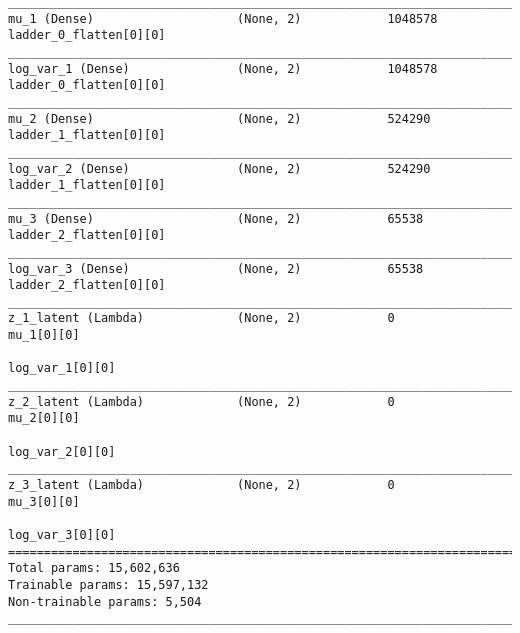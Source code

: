 \begin{lstlisting}[caption={CelebA-\ac{VLAE}-\ac{GAN} Encoder},captionpos=b,basicstyle=\tiny, label={lst:mnist-vlae-gan-encoder}]
__________________________________________________________________________________________________
mu_1 (Dense)                    (None, 2)            1048578     ladder_0_flatten[0][0]
__________________________________________________________________________________________________
log_var_1 (Dense)               (None, 2)            1048578     ladder_0_flatten[0][0]
__________________________________________________________________________________________________
mu_2 (Dense)                    (None, 2)            524290      ladder_1_flatten[0][0]
__________________________________________________________________________________________________
log_var_2 (Dense)               (None, 2)            524290      ladder_1_flatten[0][0]
__________________________________________________________________________________________________
mu_3 (Dense)                    (None, 2)            65538       ladder_2_flatten[0][0]
__________________________________________________________________________________________________
log_var_3 (Dense)               (None, 2)            65538       ladder_2_flatten[0][0]
__________________________________________________________________________________________________
z_1_latent (Lambda)             (None, 2)            0           mu_1[0][0]
                                                                 log_var_1[0][0]
__________________________________________________________________________________________________
z_2_latent (Lambda)             (None, 2)            0           mu_2[0][0]
                                                                 log_var_2[0][0]
__________________________________________________________________________________________________
z_3_latent (Lambda)             (None, 2)            0           mu_3[0][0]
                                                                 log_var_3[0][0]
==================================================================================================
Total params: 15,602,636
Trainable params: 15,597,132
Non-trainable params: 5,504
__________________________________________________________________________________________________
\end{lstlisting}